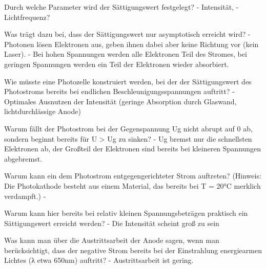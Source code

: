 Durch welche Parameter wird der Sättigungswert festgelegt? 
- Intensität, 
- Lichtfrequenz?

Was trägt dazu bei, dass der Sättigungswert nur asymptotisch erreicht wird? 
- Photonen lösen Elektronen aus, geben ihnen dabei aber keine Richtung vor (kein Laser).
- Bei hohen Spannungen werden alle Elektronen Teil des Stromes, 
	bei geringen Spannungen werden ein Teil der Elektronen wieder absorbiert.

Wie müsste eine Photozelle konstruiert werden, bei der der Sättigungswert des Photostroms bereits bei endlichen Beschleunigungsspannungen auftritt?
- Optimales Ausnutzen der Intensität (geringe Absorption durch Glaswand, lichtdurchlässige Anode)

Warum fällt der Photostrom bei der Gegenspannung Ug nicht abrupt auf 0 ab, sondern beginnt bereits für U > Ug zu sinken?
- Ug bremst nur die schnellsten Elektronen ab, der Großteil der Elektronen sind bereits bei kleineren Spannungen abgebremst.

Warum kann ein dem Photostrom entgegengerichteter Strom auftreten? 
(Hinweis: Die Photokathode besteht aus einem Material, das bereits bei T = 20°C merklich verdampft.) 
- 

Warum kann hier bereits bei relativ kleinen Spannungsbeträgen praktisch ein Sättigungswert erreicht werden?
- Die Intensität scheint groß zu sein

Was kann man über die Austrittsarbeit der Anode sagen, wenn man berücksichtigt, dass der negative Strom bereits bei der
Einstrahlung energiearmen Lichtes (λ etwa 650nm) auftritt? 
- Austrittsarbeit ist gering.